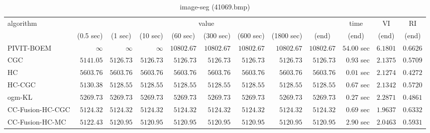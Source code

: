 \begin{table}[H]
\scriptsize
\centering
\caption{image-seg (41069.bmp)}
\label{tab:anytimetable-image-seg-41069.bmp}
\begin{tabular}{lrrrrrrrrrrr}
\toprule
           algorithm &                                   \multicolumn{8}{c}{value} & \multicolumn{1}{c}{time}    & \multicolumn{1}{c}{VI}  & \multicolumn{1}{c}{RI} \\  
\cmidrule(lr){2-9}\cmidrule(lr){10-10} \cmidrule(lr){11-11} \cmidrule(lr){12-12}   
                     & \multicolumn{1}{c}{(0.5 sec)} & \multicolumn{1}{c}{(1 sec)} & \multicolumn{1}{c}{(10 sec)} & \multicolumn{1}{c}{(60 sec)} & \multicolumn{1}{c}{(300 sec)} & \multicolumn{1}{c}{(600 sec)} & \multicolumn{1}{c}{(1800 sec)} & \multicolumn{1}{c}{(end)} & \multicolumn{1}{c}{(end)}    & \multicolumn{1}{c}{(end)}   & \multicolumn{1}{c}{(end)}  \\ \midrule 
          PIVIT-BOEM & $\infty$ & $\infty$ & $\infty$ & $     10802.67$ & $     10802.67$ & $     10802.67$ & $     10802.67$ & $     10802.67$ & $        54.00$ sec    & $       6.1801$  & $       0.6626$ \\ 
                 CGC & $      5141.05$ & $      5126.73$ & $      5126.73$ & $      5126.73$ & $      5126.73$ & $      5126.73$ & $      5126.73$ & $      5126.73$ & $         0.93$ sec    & $       2.1375$  & $       0.5709$ \\ 
                  HC & $      5603.76$ & $      5603.76$ & $      5603.76$ & $      5603.76$ & $      5603.76$ & $      5603.76$ & $      5603.76$ & $      5603.76$ & $         0.01$ sec    & $       2.1274$  & $       0.4272$ \\ 
              HC-CGC & $      5130.38$ & $      5128.55$ & $      5128.55$ & $      5128.55$ & $      5128.55$ & $      5128.55$ & $      5128.55$ & $      5128.55$ & $         0.67$ sec    & $       2.1342$  & $       0.5720$ \\ 
              ogm-KL & $      5269.73$ & $      5269.73$ & $      5269.73$ & $      5269.73$ & $      5269.73$ & $      5269.73$ & $      5269.73$ & $      5269.73$ & $         0.27$ sec    & $       2.2871$  & $       0.4861$ \\ 
    CC-Fusion-HC-CGC & $      5124.32$ & $      5124.32$ & $      5124.32$ & $      5124.32$ & $      5124.32$ & $      5124.32$ & $      5124.32$ & $      5124.32$ & $         0.69$ sec    & $       1.9637$  & $       0.6332$ \\ 
     CC-Fusion-HC-MC & $      5122.43$ & $      5120.95$ & $      5120.95$ & $      5120.95$ & $      5120.95$ & $      5120.95$ & $      5120.95$ & $      5120.95$ & $         2.90$ sec    & $       2.0463$  & $       0.5931$ \\ 

\end{tabular}
\end{table}
